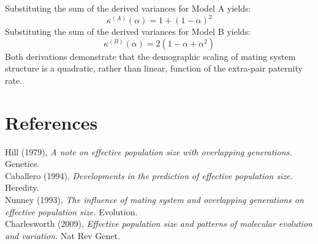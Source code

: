 \documentclass[11pt]{article}
\begin{document}
Substituting the sum of the derived variances for Model A yields:
\begin{equation}
    \kappa^{(A)}(\alpha) = 1 + (1-\alpha)^2
\end{equation}
Substituting the sum of the derived variances for Model B yields:
\begin{equation}
    \kappa^{(B)}(\alpha) = 2(1 - \alpha + \alpha^2)
\end{equation}
Both derivations demonstrate that the demographic scaling of mating system structure is a quadratic, rather than linear, function of the extra-pair paternity rate.

\section*{References}

Hill (1979), \emph{A note on effective population size with overlapping generations.} Genetics.\\
Caballero (1994), \emph{Developments in the prediction of effective population size.} Heredity.\\
Nunney (1993), \emph{The influence of mating system and overlapping generations on effective population size.} Evolution.\\
Charlesworth (2009), \emph{Effective population size and patterns of molecular evolution and variation.} Nat Rev Genet.
\end{document}
